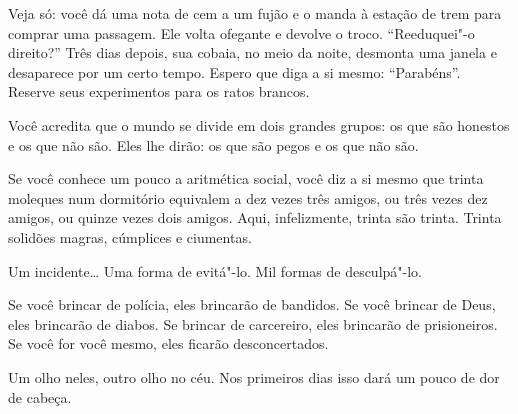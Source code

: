 Veja só: você dá uma nota de cem a um fujão e o manda à estação de trem
para comprar uma passagem. Ele volta ofegante e devolve o troco.
``Reeduquei"-o direito?'' Três dias depois, sua cobaia, no meio da noite,
desmonta uma janela e desaparece por um certo tempo. Espero que diga a
si mesmo: ``Parabéns''. Reserve seus experimentos para os ratos brancos.

\bigskip
\bigskip

Você acredita que o mundo se divide em dois grandes grupos: os que são
honestos e os que não são. Eles lhe dirão: os que são pegos e os que não
são.

\bigskip
\bigskip

Se você conhece um pouco a aritmética social, você diz a si mesmo que
trinta moleques num dormitório equivalem a dez vezes três amigos, ou
três vezes dez amigos, ou quinze vezes dois amigos. Aqui, infelizmente,
trinta são trinta. Trinta solidões magras, cúmplices e ciumentas.

\bigskip
\bigskip


Um incidente\ldots{} Uma forma de evitá"-lo. Mil formas de desculpá"-lo.

\bigskip
\bigskip

Se você brincar de polícia, eles brincarão de bandidos. Se você brincar
de Deus, eles brincarão de diabos. Se brincar de carcereiro, eles
brincarão de prisioneiros. Se você for você mesmo, eles ficarão
desconcertados.

\bigskip
\bigskip

Um olho neles, outro olho no céu. Nos primeiros dias isso dará um pouco
de dor de cabeça.

\bigskip
\bigskip

\pagebreak
\thispagestyle{empty}

